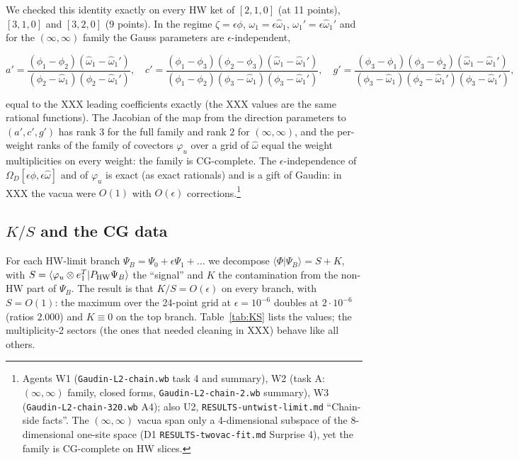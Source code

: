 \documentclass[11pt]{article}
\begin{document}
We checked this identity exactly on every HW ket of $[2,1,0]$ (at 11 points), $[3,1,0]$ and $[3,2,0]$ (9 points).
In the regime $\zeta=\epsilon\phi$, $\omega_1=\epsilon\hat\omega_1$, $\omega_1'=\epsilon\hat\omega_1'$ and for the $(\infty,\infty)$ family the Gauss parameters are $\epsilon$-independent,

\begin{equation}
a'=\frac{(\phi_1-\phi_2)(\hat\omega_1-\hat\omega_1')}{(\phi_2-\hat\omega_1)(\phi_2-\hat\omega_1')},\quad
c'=\frac{(\phi_1-\phi_3)(\phi_2-\phi_3)(\hat\omega_1-\hat\omega_1')}{(\phi_1-\phi_2)(\phi_3-\hat\omega_1)(\phi_3-\hat\omega_1')},\quad
g'=\frac{(\phi_3-\phi_1)(\phi_3-\phi_2)(\hat\omega_1-\hat\omega_1')}{(\phi_3-\hat\omega_1)(\phi_2-\hat\omega_1')(\phi_3-\hat\omega_1')},\label{eq:gauss}
\end{equation}

equal to the XXX leading coefficients exactly (the XXX values are the same rational functions).
The Jacobian of the map from the direction parameters to $(a',c',g')$ has rank $3$ for the full family and rank $2$ for $(\infty,\infty)$, and the per-weight ranks of the family of covectors $\varphi_u$ over a grid of $\hat\omega$ equal the weight multiplicities on every weight: the family is CG-complete.
The $\epsilon$-independence of $\Omega_D[\epsilon\phi,\epsilon\hat\omega]$ and of $\varphi_u$ is exact (as exact rationals) and is a gift of Gaudin: in XXX the vacua were $O(1)$ with $O(\epsilon)$ corrections.\footnote{Agents W1 (\texttt{Gaudin-\allowbreak{}L2-\allowbreak{}chain.\allowbreak{}wb} task 4 and summary), W2 (task A: $(\infty,\infty)$ family, closed forms, \texttt{Gaudin-\allowbreak{}L2-\allowbreak{}chain-\allowbreak{}2.\allowbreak{}wb} summary), W3 (\texttt{Gaudin-\allowbreak{}L2-\allowbreak{}chain-\allowbreak{}320.\allowbreak{}wb} A4); also U2, \texttt{RESULTS-\allowbreak{}untwist-\allowbreak{}limit.\allowbreak{}md} ``Chain-side facts''. The $(\infty,\infty)$ vacua span only a 4-dimensional subspace of the 8-dimensional one-site space (D1 \texttt{RESULTS-\allowbreak{}twovac-\allowbreak{}fit.\allowbreak{}md} Surprise 4), yet the family is CG-complete on HW slices.}

\subsection{\texorpdfstring{$K/S$}{K/S} and the CG data}\label{sec:KS}

For each HW-limit branch $\Psi_B=\Psi_0+\epsilon\Psi_1+\dots$ we decompose $\langle\Phi|\Psi_B\rangle=S+K$, with $S=\langle\varphi_u\otimes e_1^T|P_{\rm HW}\Psi_B\rangle$ the ``signal'' and $K$ the contamination from the non-HW part of $\Psi_B$. The result is that $K/S=O(\epsilon)$ on every branch, with $S=O(1)$: the maximum over the 24-point grid at $\epsilon=10^{-6}$ doubles at $2\cdot10^{-6}$ (ratios $2.000$) and $K\equiv0$ on the top branch.
Table~\ref{tab:KS} lists the values; the multiplicity-2 sectors (the ones that needed cleaning in XXX) behave like all others.
\end{document}
